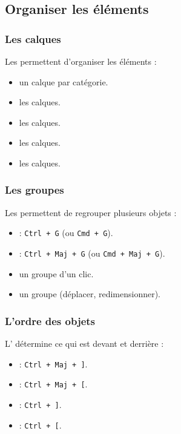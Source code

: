 \subsection{Organiser les éléments}

\subsubsection{Les calques}

Les  permettent d'organiser les éléments :

\begin{itemize}
    \item {} un calque par catégorie.
    \item {} les calques.
    \item {} les calques.
    \item {} les calques.
    \item {} les calques.
\end{itemize}

\subsubsection{Les groupes}

Les  permettent de regrouper plusieurs objets :

\begin{itemize}
    \item {} : \texttt{Ctrl + G} (ou \texttt{Cmd + G}).
    \item {} : \texttt{Ctrl + Maj + G} (ou \texttt{Cmd + Maj + G}).
    \item {} un groupe d'un clic.
    \item {} un groupe (déplacer, redimensionner).
\end{itemize}

\subsubsection{L'ordre des objets}

L' détermine ce qui est devant et derrière :

\begin{itemize}
    \item {} : \texttt{Ctrl + Maj + ]}.
    \item {} : \texttt{Ctrl + Maj + [}.
    \item {} : \texttt{Ctrl + ]}.
    \item {} : \texttt{Ctrl + [}.
\end{itemize}

